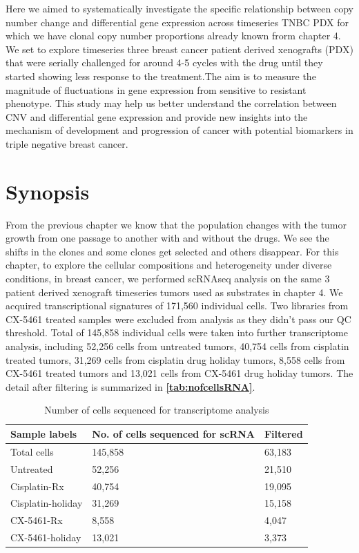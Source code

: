 Here we aimed to systematically investigate the specific relationship between copy number change and differential gene expression across timeseries TNBC PDX for which we have clonal copy number proportions already known frorm chapter 4. We set to explore timeseries three breast cancer patient derived xenografts (PDX) that were serially challenged for around 4-5 cycles with the drug until they started showing less response to the treatment.The aim is to measure the magnitude of fluctuations in gene expression from sensitive to resistant phenotype.
This study may help us better understand the correlation between CNV and differential gene expression and provide new insights into the mechanism of development and progression of cancer with potential biomarkers in triple negative breast cancer.

 \section{Synopsis}
 From the previous chapter we know that the population changes with the tumor growth from one passage to another with and without the drugs. We see the shifts in the clones and some clones get selected and others disappear.
For this chapter, to explore the cellular compositions and heterogeneity under diverse conditions, in breast cancer, we performed scRNAseq analysis on the same 3 patient derived xenograft timeseries tumors used as substrates in chapter 4. We acquired transcriptional signatures of 171,560 individual cells. Two libraries from CX-5461 treated samples were excluded from analysis as they didn't pass our QC threshold. Total of 145,858 individual cells were taken into further transcriptome analysis, including  52,256 cells from untreated tumors, 40,754 cells from cisplatin treated tumors, 31,269 cells from cisplatin drug holiday tumors, 8,558 cells from CX-5461 treated tumors and 13,021 cells from CX-5461 drug holiday tumors. The detail after filtering is summarized in  \textbf{\autoref{tab:nofcellsRNA}}.

\begin{table}[htbp]
 \centering
  \caption{Number of cells sequenced for transcriptome analysis}
{
\begin{tabular}{|l|l|l|}
\hline
Sample labels     & No. of cells sequenced for scRNA & Filtered \\
\hline
Total cells          & 145,858                          & 63,183\\
Untreated         & 52,256                           & 21,510    \\
Cisplatin-Rx      & 40,754                           & 19,095    \\
Cisplatin-holiday & 31,269                           & 15,158    \\
CX-5461-Rx        & 8,558                            & 4,047     \\
CX-5461-holiday   & 13,021                           & 3,373  \\  
\hline
\end{tabular}%
\label{tab:nofcellsRNA}
}
\end{table}


